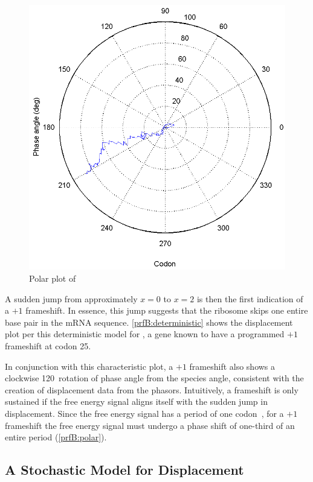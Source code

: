 \documentclass[12pt]{article}
\numberwithin{equation}{section}
\begin{document}
\begin{figure}
  \centering
  \caption{Polar plot of \prfB}
  \label{prfB:polar}
  \includegraphics[scale=0.5]{prfB/polar}
\end{figure}

A sudden jump from approximately $x = 0$ to $x = 2$ is then the first indication of a $+1$ frameshift.
In essence, this jump suggests that the ribosome skips one entire base pair in the mRNA sequence.
\autoref{prfB:deterministic} shows the displacement plot per this deterministic model for \prfB, 
a gene known to have a programmed $+1$ frameshift at codon 25.

In conjunction with this characteristic plot, a $+1$ frameshift also shows a clockwise 120\degree\
rotation of phase angle from the species angle, consistent with the creation of displacement data from the phasors.
Intuitively, a frameshift is only sustained if the free energy signal aligns itself with the sudden jump in displacement.
Since the free energy signal has a period of one codon~\cite{lalit:mechanics}, for a $+1$ frameshift the free energy signal
must undergo a phase shift of one-third of an entire period (\autoref{prfB:polar}).

\subsection{A Stochastic Model for Displacement}
\label{stochastic}
\end{document}
